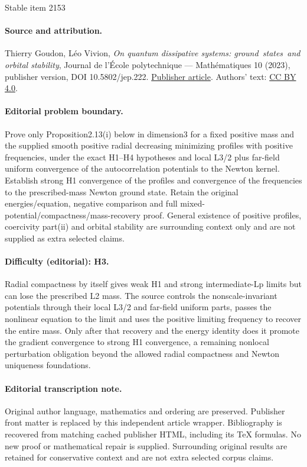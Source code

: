 \documentclass[11pt]{article}
\theoremstyle{definition}
\begin{document}
\begin{center}{\Large Stable item 2153}\end{center}
\paragraph{Source and attribution.}
Thierry Goudon, Léo Vivion, \emph{On quantum dissipative systems: ground states and orbital stability}, Journal de l’École polytechnique — Mathématiques 10 (2023), publisher version, DOI 10.5802/jep.222. \href{https://jep.centre-mersenne.org/articles/10.5802/jep.222/}{Publisher article}. Authors' text: \href{https://creativecommons.org/licenses/by/4.0/}{CC BY 4.0}.
\paragraph{Editorial problem boundary.}
Prove only Proposition2.13(i) below in dimension3 for a fixed positive mass and the supplied smooth positive radial decreasing minimizing profiles with positive frequencies, under the exact H1–H4 hypotheses and local L3/2 plus far-field uniform convergence of the autocorrelation potentials to the Newton kernel. Establish strong H1 convergence of the profiles and convergence of the frequencies to the prescribed-mass Newton ground state. Retain the original energies/equation, negative comparison and full mixed-potential/compactness/mass-recovery proof. General existence of positive profiles, coercivity part(ii) and orbital stability are surrounding context only and are not supplied as extra selected claims.
\paragraph{Difficulty (editorial): H3.}
Radial compactness by itself gives weak H1 and strong intermediate-Lp limits but can lose the prescribed L2 mass. The source controls the nonscale-invariant potentials through their local L3/2 and far-field uniform parts, passes the nonlinear equation to the limit and uses the positive limiting frequency to recover the entire mass. Only after that recovery and the energy identity does it promote the gradient convergence to strong H1 convergence, a remaining nonlocal perturbation obligation beyond the allowed radial compactness and Newton uniqueness foundations.
\paragraph{Editorial transcription note.}
Original author language, mathematics and ordering are preserved. Publisher front matter is replaced by this independent article wrapper. Bibliography is recovered from matching cached publisher HTML, including its TeX formulas. No new proof or mathematical repair is supplied. Surrounding original results are retained for conservative context and are not extra selected corpus claims.
\clearpage
\end{document}
